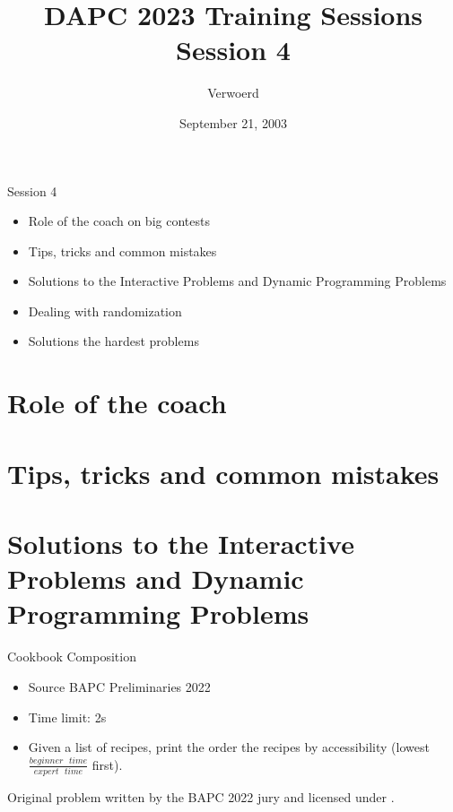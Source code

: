 \documentclass[11pt,pdf, aspectratio=169]{beamer}
\title{DAPC 2023 Training Sessions\\Session 4}
\author{Verwoerd}
\date{September 21, 2003}
\begin{document}
  \maketitle
  \begin{frame}{Session 4}
    \begin{itemize}
      \item Role of the coach on big contests
      \item Tips, tricks and common mistakes
      \item Solutions to the Interactive Problems and Dynamic Programming Problems
      \item Dealing with randomization
      \item Solutions the hardest problems
    \end{itemize}
    \doclicenseThis
  \end{frame}


  \section{Role of the coach}


  \section{Tips, tricks and common mistakes}


  \section{Solutions to the Interactive Problems and Dynamic Programming Problems}
  \begin{frame}{Cookbook Composition}
    \begin{itemize}
      \item Source BAPC Preliminaries 2022
      \item Time limit: 2s
      \item Given a list of recipes, print the order the recipes by accessibility (lowest $\frac{beginner\text{ }time}{expert\text{ }time}$ first).

    \end{itemize}
    Original problem written by the BAPC 2022 jury and licensed under \doclicenseLongNameRef.

    \doclicenseImage
  \end{frame}
\end{document}
